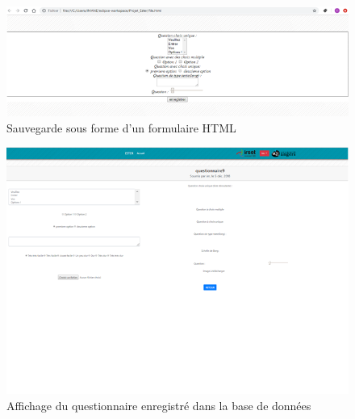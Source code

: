 \begin{figure}[H]
    \begin{center}
	\includegraphics[scale=0.7]{img/questionnaire/fichier}
    \end{center}
    \caption{Sauvegarde sous forme d'un formulaire HTML}
\end{figure}

\begin{figure}[H]
    \begin{center}
	\includegraphics[scale=0.7]{img/questionnaire/affichage}
    \end{center}
    \caption{Affichage du questionnaire enregistré dans la base de données}
\end{figure}